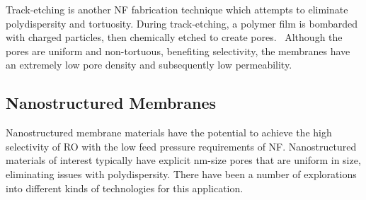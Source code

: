   Track-etching is another NF fabrication technique which attempts to eliminate 
  polydispersity and tortuosity. During track-etching, a polymer film is bombarded with 
  charged particles, then chemically etched to create pores.~\cite{apel_track_2001}
  Although the pores are uniform and non-tortuous, benefiting selectivity, the 
  membranes have an extremely low pore density and subsequently low permeability. 
  
  \subsection{Nanostructured Membranes}
  
  Nanostructured membrane materials have the potential to achieve the high selectivity
  of RO with the low feed pressure requirements of NF. Nanostructured materials of 
  interest typically have explicit nm-size pores that are uniform in size, eliminating
  issues with polydispersity. There have been a number of explorations into different
  kinds of technologies for this application.
  
